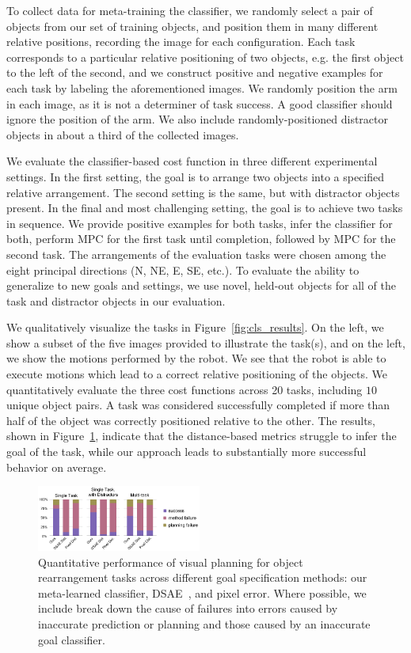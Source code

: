 To collect data for meta-training the classifier, we randomly select a pair of objects from our set of training objects, and position them in many different relative positions, recording the image for each configuration. Each task corresponds to a particular relative positioning of two objects, e.g. the first object to the left of the second, and we construct positive and negative examples for each task by labeling the aforementioned images. We randomly position the arm in each image, as it is not a determiner of task success. A good classifier should ignore the position of the arm. We also include randomly-positioned distractor objects in about a third of the collected images.

We evaluate the classifier-based cost function in three different experimental settings. In the first setting, the goal is to arrange two objects into a specified relative arrangement. The second setting is the same, but with distractor objects present. In the final and most challenging setting, the goal is to achieve two tasks in sequence. We provide positive examples for both tasks, infer the classifier for both, perform MPC for the first task until completion, followed by MPC for the second task. The arrangements of the evaluation tasks were chosen among the eight principal directions (N, NE, E, SE, etc.). To evaluate the ability to generalize to new goals and settings, we use novel, held-out objects for all of the task and distractor objects in our evaluation.

We qualitatively visualize the tasks in Figure~\ref{fig:cls_results}. On the left, we show a subset of the five images provided to illustrate the task(s), and on the left, we show the motions performed by the robot. We see that the robot is able to execute motions which lead to a correct relative positioning of the objects.
We quantitatively evaluate the three cost functions across 20 tasks, including $10$ unique object pairs. A task was considered successfully completed if more than half of the object was correctly positioned relative to the other. The results, shown in Figure~\ref{fig:cls_charts}, indicate that the distance-based metrics struggle to infer the goal of the task, while our approach leads to substantially more successful behavior on average.

\begin{figure}
    \centering
    \includegraphics[width=0.48\textwidth]{images_cls/cls_charts_2.jpeg}
    \caption{\small Quantitative performance of visual planning for object rearrangement tasks across different goal specification methods: our meta-learned classifier, DSAE~\cite{dsae}, and pixel error. Where possible, we include break down the cause of failures into errors caused by inaccurate prediction or planning and those caused by an inaccurate goal classifier.}
    \label{fig:cls_charts}
    \vspace{-0.3cm}
\end{figure}


